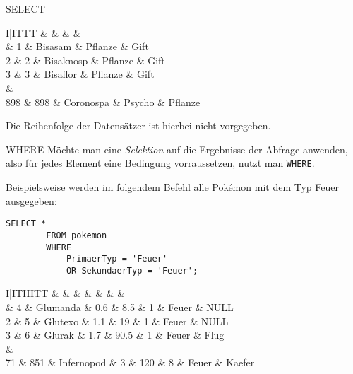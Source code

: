 \begin{sql}{SELECT}
    \setcounter{rownum}{0}
    \begin{tabular}{I|ITTT}
        &  &  &  &  \\ & 1 & Bisasam & Pflanze & Gift \\
        2 & 2 & Bisaknosp & Pflanze & Gift \\
        3 & 3 & Bisaflor & Pflanze & Gift \\
         &  \\
        898 & 898 & Coronospa & Psycho & Pflanze \\
    \end{tabular}

    Die Reihenfolge der Datensätzer ist hierbei nicht vorgegeben.
\end{sql}

\begin{sql}{WHERE}
    Möchte man eine \emph{Selektion} auf die Ergebnisse der Abfrage anwenden, also für jedes Element eine Bedingung vorraussetzen, nutzt man \texttt{WHERE}.

    Beispielsweise werden im folgendem Befehl alle Pokémon mit dem Typ Feuer ausgegeben:

    \begin{lstlisting}[language=mysql]
        SELECT *
        FROM pokemon
        WHERE
            PrimaerTyp = 'Feuer'
            OR SekundaerTyp = 'Feuer';
    \end{lstlisting}

    \setcounter{rownum}{0}
    \begin{tabular}{I|ITIIITT}
        &  &  &  &  &  &  &  \\ & 4 & Glumanda & 0.6 & 8.5 & 1 & Feuer & NULL \\
        2 & 5 & Glutexo & 1.1 & 19 & 1 & Feuer & NULL \\
        3 & 6 & Glurak & 1.7 & 90.5 & 1 & Feuer & Flug \\
         &  \\
        71 & 851 & Infernopod & 3 & 120 & 8 & Feuer & Kaefer \\
    \end{tabular}
\end{sql}

